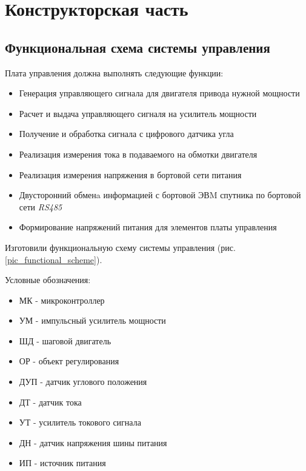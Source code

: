 \clearpage
\section{Конструкторская часть}

\subsection{Функциональная схема системы управления}
Плата управления должна выполнять следующие функции:
\begin{itemize}
    \item Генерация управляющего сигнала для двигателя привода нужной мощности
    \item Расчет и выдача управляющего сигналя на усилитель мощности
    \item Получение и обработка сигнала с цифрового датчика угла
    \item Реализация измерения тока в подаваемого на обмотки двигателя
    \item Реализация измерения напряжения в бортовой сети питания
    \item Двусторонний обменa информацией с бортовой ЭВM спутника по бортовой
            сети \textit{RS485}
    \item Формирование напряжений питания для элементов платы управления
\end{itemize}

Изготовили функциональную схему системы управления
(рис. \ref{pic_functional_scheme}).

Условные обозначения:
\begin{itemize}
    \item МК - микроконтроллер
    \item УМ - импульсный усилитель мощности
    \item ШД - шаговой двигатель
    \item ОР - объект регулирования
    \item ДУП - датчик углового положения
    \item ДТ - датчик тока
    \item УТ - усилитель токового сигнала
    \item ДН - датчик напряжения шины питания
    \item ИП - источник питания
\end{itemize}


